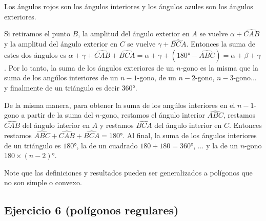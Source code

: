 Los ángulos rojos son los ángulos interiores y los
ángulos azules son los ángulos exteriores.

\begin{center}
\end{center}

Si retiramos el punto $B$, la amplitud del ángulo exterior en $A$ se vuelve
$\alpha + \widehat{CAB}$ y la amplitud del ángulo exterior en $C$ se vuelve
$\gamma + \widehat{BCA}$. Entonces la suma de estes dos ángulos es
$\alpha + \gamma + \widehat{CAB} + \widehat{BCA} =
\alpha + \gamma + {(180° - \widehat{ABC})} = \alpha+\beta+\gamma$.
Por lo tanto, la suma de los ángulos exteriores de un
$n$-gono es la misma que la suma de los angúlos interiores de un $n-1$-gono,
de un $n-2$-gono, $n-3$-gono... y finalmente de un triángulo es decir 360°.

De la misma manera, para obtener la suma de los angúlos interiores en el
$n-1$-gono a partir de la suma del $n$-gono,
restamos el ángulo interior $\widehat{ABC}$,
restamos $\widehat{CAB}$ del ángulo interior en $A$ y
restamos $\widehat{BCA}$ del ángulo interior en $C$. Entonces restamos
$\widehat{ABC}+\widehat{CAB}+\widehat{BCA}=180°$. Al final,
la suma de los ángulos interiores de un triángulo es $180°$, la de un
cuadrado $180+180=360°$, ... y la de un $n$-gono $180\times {(n-2)}$°.

Note que las definiciones y resultados pueden ser generalizados a polígonos
que no son simple o convexo.

\subsection{Ejercicio 6 (polígonos regulares)}

